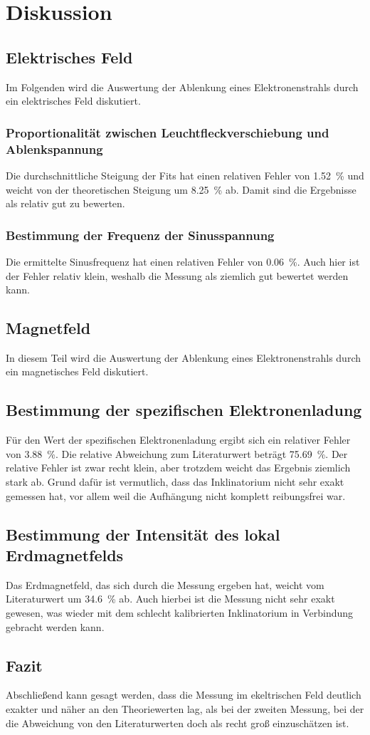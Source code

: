 \section{Diskussion}
\label{sec:Diskussion}

\subsection{Elektrisches Feld}
Im Folgenden wird die Auswertung der Ablenkung eines Elektronenstrahls durch ein elektrisches Feld diskutiert. 
\subsubsection{Proportionalität zwischen Leuchtfleckverschiebung und Ablenkspannung}
Die durchschnittliche Steigung der Fits hat einen relativen Fehler von \SI{1.52}{\percent} und weicht von der 
theoretischen Steigung um \SI{8.25}{\percent} ab. Damit sind die Ergebnisse als relativ gut zu bewerten.

\subsubsection{Bestimmung der Frequenz der Sinusspannung}
Die ermittelte Sinusfrequenz hat einen relativen Fehler von \SI{0.06}{\percent}. Auch hier ist der Fehler relativ klein, weshalb die Messung als ziemlich gut bewertet werden kann. 


\subsection{Magnetfeld}
In diesem Teil wird die Auswertung der Ablenkung eines Elektronenstrahls durch ein magnetisches Feld diskutiert. 

\subsection{Bestimmung der spezifischen Elektronenladung}
Für den Wert der spezifischen Elektronenladung ergibt sich ein relativer Fehler von \SI{3.88}{\percent}. Die relative 
Abweichung zum Literaturwert beträgt \SI{75.69}{\percent}. Der relative Fehler ist zwar recht klein, aber trotzdem weicht das Ergebnis ziemlich stark ab. 
Grund dafür ist vermutlich, dass das Inklinatorium nicht sehr exakt gemessen hat, vor allem weil die Aufhängung nicht komplett reibungsfrei war. 


\subsection{Bestimmung der Intensität des lokal Erdmagnetfelds}
Das Erdmagnetfeld, das sich durch die Messung ergeben hat, weicht vom Literaturwert um \SI{34.6}{\percent} ab. Auch hierbei ist die Messung nicht sehr exakt gewesen, was wieder mit dem schlecht kalibrierten Inklinatorium in Verbindung gebracht werden kann. 

\subsection{Fazit}
Abschließend kann gesagt werden, dass die Messung im ekeltrischen Feld deutlich exakter und näher an den Theoriewerten lag, als bei der zweiten Messung, bei der die Abweichung von den Literaturwerten doch als recht groß einzuschätzen ist. 
